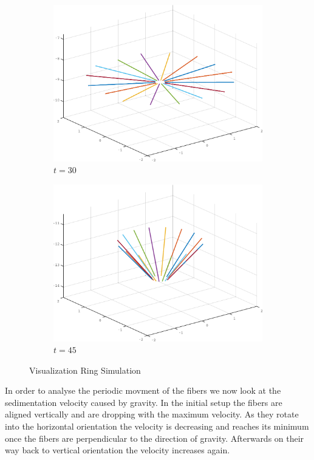 \documentclass[a4paper,11pt]{kth-mag}
\begin{document}
\begin{figure}[!htbp]
\begin{subfigure}[h]{0.45\textwidth}
    \includegraphics[width=\textwidth]{img/ring_00030.pdf}
    \caption{$t=30$}\label{fig:ring_simulation_1c}
  \end{subfigure}
  \begin{subfigure}[h]{0.45\textwidth}
    \centering
    \includegraphics[width=\textwidth]{img/ring_00045.pdf}
    \caption{$t=45$}\label{fig:ring_simulation_1d}
  \end{subfigure}
  \caption{Visualization Ring Simulation}
  \label{fig:ring_simulation}
\end{figure}

In order to analyse the periodic movment of the fibers we now look at the sedimentation velocity caused by gravity. In the initial setup the fibers are aligned vertically and are dropping with the maximum velocity. As they rotate into the horizontal orientation the velocity is decreasing and reaches its minimum once the fibers are perpendicular to the direction of gravity. Afterwards on their way back to vertical orientation the velocity increases again.
\end{document}
